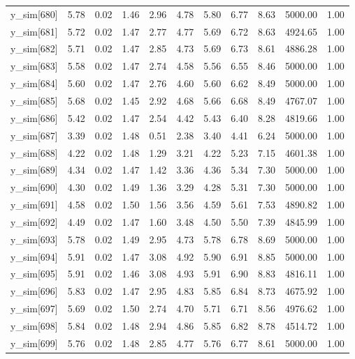\begin{table}[ht]
\begin{tabular}{rrrrrrrrrrr}
  y\_sim[680] & 5.78 & 0.02 & 1.46 & 2.96 & 4.78 & 5.80 & 6.77 & 8.63 & 5000.00 & 1.00 \\ 
  y\_sim[681] & 5.72 & 0.02 & 1.47 & 2.77 & 4.77 & 5.69 & 6.72 & 8.63 & 4924.65 & 1.00 \\ 
  y\_sim[682] & 5.71 & 0.02 & 1.47 & 2.85 & 4.73 & 5.69 & 6.73 & 8.61 & 4886.28 & 1.00 \\ 
  y\_sim[683] & 5.58 & 0.02 & 1.47 & 2.74 & 4.58 & 5.56 & 6.55 & 8.46 & 5000.00 & 1.00 \\ 
  y\_sim[684] & 5.60 & 0.02 & 1.47 & 2.76 & 4.60 & 5.60 & 6.62 & 8.49 & 5000.00 & 1.00 \\ 
  y\_sim[685] & 5.68 & 0.02 & 1.45 & 2.92 & 4.68 & 5.66 & 6.68 & 8.49 & 4767.07 & 1.00 \\ 
  y\_sim[686] & 5.42 & 0.02 & 1.47 & 2.54 & 4.42 & 5.43 & 6.40 & 8.28 & 4819.66 & 1.00 \\ 
  y\_sim[687] & 3.39 & 0.02 & 1.48 & 0.51 & 2.38 & 3.40 & 4.41 & 6.24 & 5000.00 & 1.00 \\ 
  y\_sim[688] & 4.22 & 0.02 & 1.48 & 1.29 & 3.21 & 4.22 & 5.23 & 7.15 & 4601.38 & 1.00 \\ 
  y\_sim[689] & 4.34 & 0.02 & 1.47 & 1.42 & 3.36 & 4.36 & 5.34 & 7.30 & 5000.00 & 1.00 \\ 
  y\_sim[690] & 4.30 & 0.02 & 1.49 & 1.36 & 3.29 & 4.28 & 5.31 & 7.30 & 5000.00 & 1.00 \\ 
  y\_sim[691] & 4.58 & 0.02 & 1.50 & 1.56 & 3.56 & 4.59 & 5.61 & 7.53 & 4890.82 & 1.00 \\ 
  y\_sim[692] & 4.49 & 0.02 & 1.47 & 1.60 & 3.48 & 4.50 & 5.50 & 7.39 & 4845.99 & 1.00 \\ 
  y\_sim[693] & 5.78 & 0.02 & 1.49 & 2.95 & 4.73 & 5.78 & 6.78 & 8.69 & 5000.00 & 1.00 \\ 
  y\_sim[694] & 5.91 & 0.02 & 1.47 & 3.08 & 4.92 & 5.90 & 6.91 & 8.85 & 5000.00 & 1.00 \\ 
  y\_sim[695] & 5.91 & 0.02 & 1.46 & 3.08 & 4.93 & 5.91 & 6.90 & 8.83 & 4816.11 & 1.00 \\ 
  y\_sim[696] & 5.83 & 0.02 & 1.47 & 2.95 & 4.83 & 5.85 & 6.84 & 8.73 & 4675.92 & 1.00 \\ 
  y\_sim[697] & 5.69 & 0.02 & 1.50 & 2.74 & 4.70 & 5.71 & 6.71 & 8.56 & 4976.62 & 1.00 \\ 
  y\_sim[698] & 5.84 & 0.02 & 1.48 & 2.94 & 4.86 & 5.85 & 6.82 & 8.78 & 4514.72 & 1.00 \\ 
  y\_sim[699] & 5.76 & 0.02 & 1.48 & 2.85 & 4.77 & 5.76 & 6.77 & 8.61 & 5000.00 & 1.00 \\ 

\end{tabular}
\end{table}
